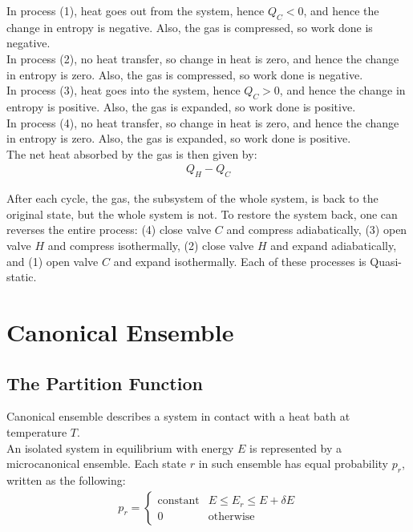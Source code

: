 \documentclass[11pt,oneside]{book}
\theoremstyle{break}
\theoremstyle{break}
\begin{document}
\hfill\break
In process (1), heat goes out from the system, hence $Q_C<0$, and hence the change in entropy is negative. Also, the gas is compressed, so work done is negative.\\

In process (2), no heat transfer, so change in heat is zero, and hence the change in entropy is zero. Also, the gas is compressed, so work done is negative.\\

In process (3), heat goes into the system, hence $Q_C>0$, and hence the change in entropy is positive. Also, the gas is expanded, so work done is positive.\\

In process (4), no heat transfer, so change in heat is zero, and hence the change in entropy is zero. Also, the gas is expanded, so work done is positive.\\

The net heat absorbed by the gas is then given by:
\begin{align*}
Q_H - Q_C
\end{align*}

After each cycle, the gas, the subsystem of the whole system, is back to the original state, but the whole system is not. To restore the system back, one can reverses the entire process: (4) close valve $C$ and compress adiabatically, (3) open valve $H$ and compress isothermally, (2) close valve $H$ and expand adiabatically, and (1) open valve $C$ and expand isothermally. Each of these processes is Quasi-static.\\

\newpage
\chapter{Canonical Ensemble}
\section[The Partition Function]{\color{red} The Partition Function\color{black}}
Canonical ensemble describes a system in contact with a heat bath at temperature $T$.\\

An isolated system in equilibrium with energy $E$ is represented by a microcanonical ensemble. Each state $r$ in such ensemble has equal probability $p_r$, written as the following:
\begin{align*}
p_r = \begin{cases}
\text{constant} & E\leq E_r \leq E+\delta E\\
0 & \text{otherwise}
\end{cases}
\end{align*}
\end{document}
